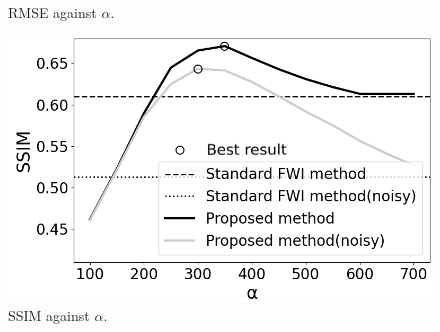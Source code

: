 \begin{figure}[htbp]
\begin{minipage}{58mm}
        \caption{RMSE against $\alpha$.}
        \label{fig:alpha-rmse}
        \vspace{-3mm}
    \end{minipage}
    \hspace{-2mm}
    \begin{minipage}{58mm}
        \centering
        \includegraphics[width=\linewidth]{public/alpha-ssim-all-edited}
        \caption{SSIM against $\alpha$.}
        \label{fig:alpha-ssim}
        \vspace{-3mm}
    \end{minipage}
\end{figure}
